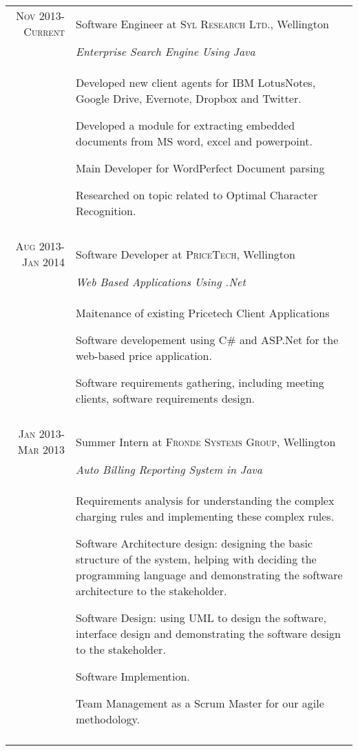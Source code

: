 \documentclass[a4paper,10pt]{article} %
\begin{document}
\begin{tabular}{r|p{11cm}}
\textsc{Nov 2013-Current} & Software Engineer at \textsc{Syl Research Ltd.}, Wellington \\
& \emph{Enterprise Search Engine Using Java}\\ 
& \footnotesize{Developed new client agents for IBM LotusNotes, Google Drive, Evernote, Dropbox and Twitter.

Developed a module for extracting embedded documents from MS word, excel and powerpoint.

Main Developer for WordPerfect Document parsing

Researched on topic related to Optimal Character Recognition.
}\\
\multicolumn{2}{c}{} \\


\textsc{Aug 2013-Jan 2014} & Software Developer at \textsc{PriceTech}, Wellington \\
& \emph{Web Based Applications Using .Net}\\ 
& \footnotesize{Maitenance of existing Pricetech Client Applications

Software developement using C\# and ASP.Net for the web-based price application.

Software requirements gathering, including meeting clients, software requirements design.
}\\
\multicolumn{2}{c}{} \\



\textsc{Jan 2013-Mar 2013} & Summer Intern at \textsc{Fronde Systems Group}, Wellington \\
& \emph{Auto Billing Reporting System in Java}\\ 
& \footnotesize{Requirements analysis for understanding the complex charging rules and implementing these complex rules.

Software Architecture design: designing the basic structure of the system, helping with deciding the programming language and demonstrating the software architecture to the stakeholder.

Software Design: using UML to design the software, interface design and demonstrating the software design to the stakeholder.

Software Implemention.

Team Management as a Scrum Master for our agile methodology.
}\\
\multicolumn{2}{c}{} \\


\end{tabular}
\end{document}
